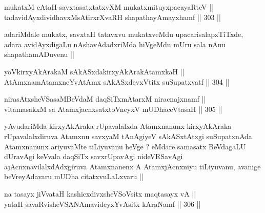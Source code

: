 \begin{shl}
mukatxM cAtaH savxtasatxtatxvXM mukatxmituyxpacayaRteV || \\
tadavidAyxdividhavxMsAtirxrXvaRH shapathayAmayxhamf ||  303 ||  
\end{shl}

\begin{artha}
adariMdale mukatx, savxtaH tatavxvu mukatxveMdu upacarisalapxTiTxde,
adara avidAyxdigaLu nAshavAdadxriMda hiVgeMdu mUru sala nAnu
shapathamADuvenu ||
\end{artha}

\begin{shl}
yoV\s kirxyAkArakaM sAkASxdakirxyAkArakAtamxkaH || \\
AtAmxnamAtamxneYvA\s \s tAmx sAkASxdevxVtitx suSupatxvatf ||  304 ||  
\end{shl}
				
\begin{shl}
nirasAtxsheVSasaMBeVdaM daqSiTxmAtarxM niracnajxnamf || \\
vitamasakxM sa AtamxjacnxsatxtoV\s neyxV mUDhaceVtasaH ||  305 ||  
\end{shl}

\begin{artha}
yAvudariMda kirxyAkAraka rUpavalalxda Atamxnanunx kirxyAkAraka
rUpavalalxdiruva Atamxnu savxyaM tAnAgiyeV sAkASxtAtxgi suSupatxnAda
Atamxnanunx ariyuvaMte tiLiyuvanu heVge ? eMdare samasatx BeVdagaLU
dUravAgi keVvala daqSiTx savxrUpavAgi nideVRSavAgi
ajAcnxnavilalxdAdxgiruva Atamxnanenx A AtamxjAcnxniyu tiLiyuvanu,
avanige beVreyAdavaru mUDha citatxvuLaLxvaru ||
\end{artha}

\begin{shl}
na tasayx jiVvataH kashicxdivxsheVSoV\s sitx maqtasayx vA || \\
yataH savaRvisheVSANAmavideyxYvAsitx kAraNamf ||  306 ||  
\end{shl}

